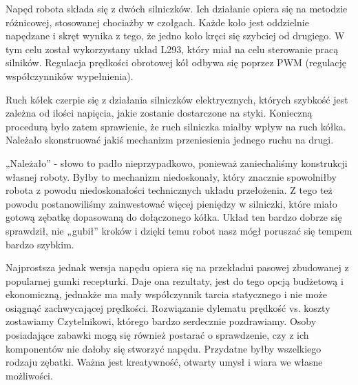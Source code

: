 Napęd robota składa się z dwóch silniczków. Ich działanie opiera się na metodzie różnicowej, stosowanej chociażby w czołgach. Każde koło jest oddzielnie napędzane i skręt wynika z tego, że jedno koło kręci się szybciej od drugiego. W tym celu został wykorzystany układ L293, który miał na celu sterowanie pracą silników. Regulacja prędkości obrotowej kół odbywa się poprzez PWM (regulację współczynników wypełnienia).

Ruch kółek czerpie się z działania silniczków elektrycznych, których szybkość jest zależna od ilości napięcia, jakie zostanie dostarczone na styki. Konieczną procedurą było zatem sprawienie, że ruch silniczka miałby wpływ na ruch kółka. Należało skonstruować jakiś mechanizm przeniesienia jednego ruchu na drugi. 

„Należało” - słowo to padło nieprzypadkowo, ponieważ zaniechaliśmy konstrukcji własnej roboty. Byłby to mechanizm niedoskonały, który znacznie spowolniłby robota z powodu niedoskonałości technicznych układu przełożenia. Z tego też powodu postanowiliśmy zainwestować więcej pieniędzy w silniczki, które miało gotową zębatkę dopasowaną do dołączonego kółka. Układ ten bardzo dobrze się sprawdził, nie „gubił” kroków i dzięki temu robot nasz mógł poruszać się tempem bardzo szybkim.

Najprostsza jednak wersja napędu opiera się na przekładni pasowej zbudowanej z popularnej gumki recepturki. Daje ona rezultaty, jest do tego opcją budżetową i ekonomiczną, jednakże ma mały współczynnik tarcia statycznego i nie może osiągnąć zachwycającej prędkości. Rozwiązanie dylematu prędkość vs. koszty zostawiamy Czytelnikowi, którego bardzo serdecznie pozdrawiamy. Osoby posiadające zabawki mogą się również postarać o sprawdzenie, czy z ich komponentów nie dałoby się stworzyć napędu. Przydatne byłby wszelkiego rodzaju zębatki. Ważna jest kreatywność, otwarty umysł i wiara we własne możliwości. 


